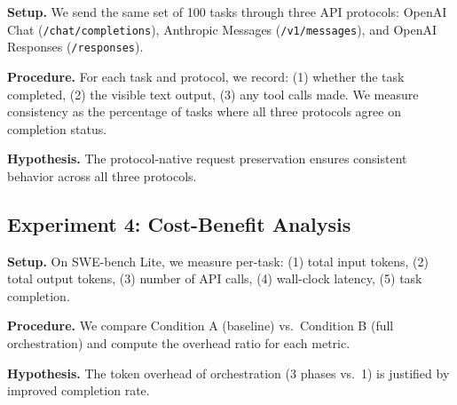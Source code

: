 \textbf{Setup.} We send the same set of 100 tasks through three API protocols: OpenAI Chat (\texttt{/chat/completions}), Anthropic Messages (\texttt{/v1/messages}), and OpenAI Responses (\texttt{/responses}).

\textbf{Procedure.} For each task and protocol, we record: (1) whether the task completed, (2) the visible text output, (3) any tool calls made. We measure consistency as the percentage of tasks where all three protocols agree on completion status.

\textbf{Hypothesis.} The protocol-native request preservation ensures consistent behavior across all three protocols.

\subsection{Experiment 4: Cost-Benefit Analysis}

\textbf{Setup.} On SWE-bench Lite, we measure per-task: (1) total input tokens, (2) total output tokens, (3) number of API calls, (4) wall-clock latency, (5) task completion.

\textbf{Procedure.} We compare Condition A (baseline) vs.\ Condition B (full orchestration) and compute the overhead ratio for each metric.

\textbf{Hypothesis.} The token overhead of orchestration (3 phases vs.\ 1) is justified by improved completion rate.
